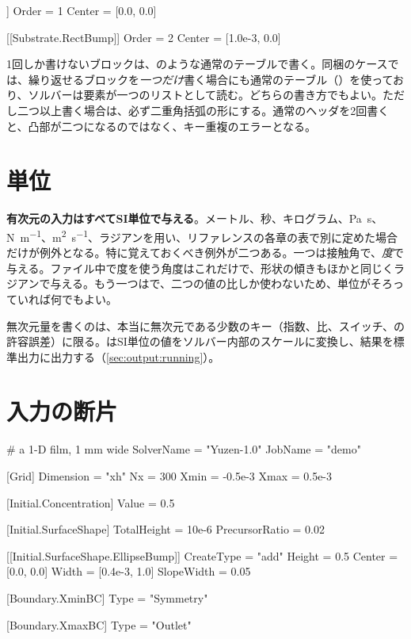 \begin{toml}
[[Substrate.RectBump]]
Order  = 1
Center = [0.0, 0.0]

[[Substrate.RectBump]]
Order  = 2
Center = [1.0e-3, 0.0]
\end{toml}

1回しか書けないブロックは、\code{[Substrate]}のような通常のテーブルで書く。同梱のケースでは、繰り返せるブロックを\emph{一つだけ}書く場合にも通常のテーブル（）を使っており、ソルバーは要素が一つのリストとして読む。どちらの書き方でもよい。ただし二つ以上書く場合は、必ず二重角括弧の形にする。通常のヘッダを2回書くと、凸部が二つになるのではなく、キー重複のエラーとなる。

\section{単位}
\label{sec:inputformat:units}

\textbf{有次元の入力はすべてSI単位で与える}。メートル、秒、キログラム、\si{\pascal\second}、\si{\newton\per\metre}、\si{\metre\squared\per\second}、ラジアンを用い、リファレンスの各章の表で別に定めた場合だけが例外となる。特に覚えておくべき例外が二つある。一つは接触角で、\emph{度}で与える。ファイル中で度を使う角度はこれだけで、形状の傾きもほかと同じくラジアンで与える。もう一つはで、二つの値の比しか使わないため、単位がそろっていれば何でもよい。

無次元量を書くのは、本当に無次元である少数のキー（指数、比、スイッチ、の許容誤差）に限る。はSI単位の値をソルバー内部のスケールに変換し、結果を標準出力に出力する（\cref{sec:output:running}）。

\section{入力の断片}
\label{sec:inputformat:example}

\begin{toml}
# a 1-D film, 1 mm wide
SolverName = "Yuzen-1.0"
JobName    = "demo"

[Grid]
Dimension = "xh"
Nx        = 300
Xmin      = -0.5e-3
Xmax      = 0.5e-3

[Initial.Concentration]
Value = 0.5

[Initial.SurfaceShape]
TotalHeight    = 10e-6
PrecursorRatio = 0.02

[[Initial.SurfaceShape.EllipseBump]]
CreateType = "add"
Height     = 0.5
Center     = [0.0, 0.0]
Width      = [0.4e-3, 1.0]
SlopeWidth = 0.05

[Boundary.XminBC]
Type = "Symmetry"

[Boundary.XmaxBC]
Type = "Outlet"
\end{toml}

